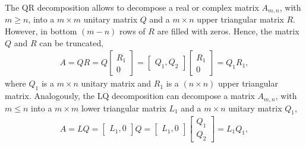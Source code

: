 The QR decomposition allows to decompose a real or complex matrix $A_{m,n}$, with $m \geq n$, into a $m \times m$ unitary matrix $Q$ and a $m \times n$ upper triangular matrix $R$. However, in bottom $(m-n)$ rows of $R$ are filled with zeros. Hence, the matrix $Q$ and $R$ can be truncated,
\begin{align}
	A = QR = Q \begin{bmatrix} R_1 \\ 0 \end{bmatrix} = \begin{bmatrix} Q_1, Q_2 \end{bmatrix} \begin{bmatrix} R_1 \\ 0 \end{bmatrix} = Q_1 R_1, 
\end{align}
where $Q_1$ is a $m \times n$ unitary matrix and $R_1$ is a $(n \times n)$ upper triangular matrix. Analogously, the LQ decomposition can decompose a matrix $A_{m,n}$, with $m \leq n$ into a $m \times m$ lower triangular matrix $L_1$ and a $m \times n$ unitary matrix $Q_1$, 
\begin{align}
	A = LQ = \begin{bmatrix} L_1, 0 \end{bmatrix} Q = \begin{bmatrix}  L_1, 0\end{bmatrix} \begin{bmatrix} Q_1 \\ Q_2 \end{bmatrix} = L_1 Q_1, 
\end{align}

